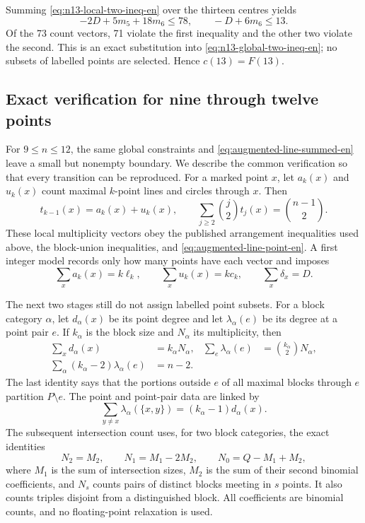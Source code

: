 Summing \eqref{eq:n13-local-two-ineq-en} over the thirteen centres yields
\begin{equation}\label{eq:n13-global-two-ineq-en}
 -2D+5m_5+18m_6\le78,
 \qquad -D+6m_6\le13.
\end{equation}
Of the 73 count vectors, 71 violate the first inequality and the other two
violate the second.  This is an exact substitution into
\eqref{eq:n13-global-two-ineq-en}; no subsets of labelled points are selected.  Hence
$c(13)=F(13)$.

\subsection{Exact verification for nine through twelve points}

For $9\le n\le12$, the same global constraints and
\eqref{eq:augmented-line-summed-en} leave a small but nonempty boundary.  We
describe the common verification so that every transition can be reproduced.
For a marked point $x$, let $a_k(x)$ and $u_k(x)$ count maximal $k$-point
lines and circles through $x$.  Then
\[
 t_{k-1}(x)=a_k(x)+u_k(x),
 \qquad
 \sum_{j\ge2}\binom j2t_j(x)=\binom{n-1}{2}.
\]
These local multiplicity vectors obey the published arrangement inequalities used above, the
block-union inequalities, and \eqref{eq:augmented-line-point-en}.  A first
integer model records only how many points have each vector and imposes
\[
 \sum_xa_k(x)=k\ell_k,\qquad
 \sum_xu_k(x)=kc_k,\qquad
 \sum_x\delta_x=D.
\]

The next two stages still do not assign labelled point subsets.  For a block category
$\alpha$, let $d_\alpha(x)$ be its point degree and let
$\lambda_\alpha(e)$ be its degree at a point pair $e$.  If $k_\alpha$ is the
block size and $N_\alpha$ its multiplicity, then
\begin{align}
 \sum_xd_\alpha(x)&=k_\alpha N_\alpha,&
 \sum_e\lambda_\alpha(e)&=\binom{k_\alpha}{2}N_\alpha,
 \label{eq:small-category-totals-en}\\
 \sum_\alpha(k_\alpha-2)\lambda_\alpha(e)&=n-2.
 \label{eq:small-pair-profile2-en}
\end{align}
The last identity says that the portions outside $e$ of all maximal blocks
through $e$ partition $P\setminus e$.  The point and point-pair data are linked by
\[
 \sum_{y\ne x}\lambda_\alpha(\{x,y\})=(k_\alpha-1)d_\alpha(x).
\]
The subsequent intersection count uses,
for two block categories, the exact identities
\[
 N_2=M_2,\qquad N_1=M_1-2M_2,\qquad N_0=Q-M_1+M_2,
\]
where $M_1$ is the sum of intersection sizes, $M_2$ is the sum of their second
binomial coefficients, and $N_s$ counts pairs of
distinct blocks meeting in $s$ points.  It also counts triples disjoint from
a distinguished block.  All coefficients are binomial counts, and no
floating-point relaxation is used.

